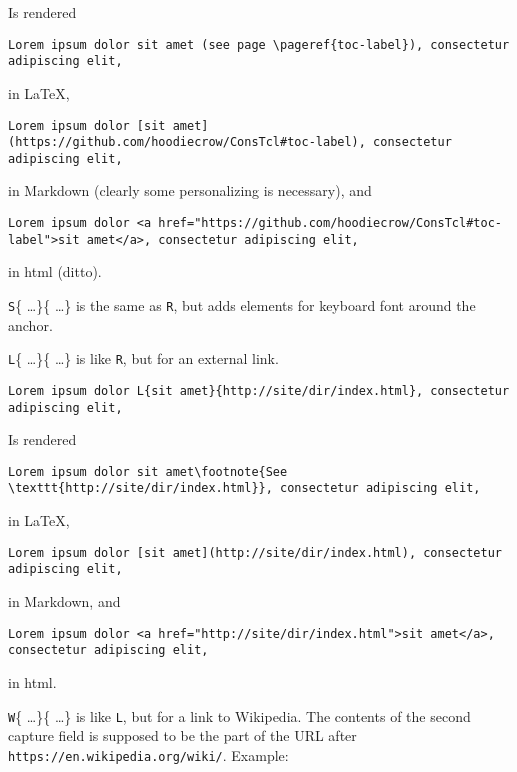 Is rendered

\begin{verbatim}
Lorem ipsum dolor sit amet (see page \pageref{toc-label}), consectetur adipiscing elit,
\end{verbatim}

in \LaTeX{},

\begin{verbatim}
Lorem ipsum dolor [sit amet](https://github.com/hoodiecrow/ConsTcl#toc-label), consectetur adipiscing elit,
\end{verbatim}

in Markdown (clearly some personalizing is necessary), and

\begin{verbatim}
Lorem ipsum dolor <a href="https://github.com/hoodiecrow/ConsTcl#toc-label">sit amet</a>, consectetur adipiscing elit,
\end{verbatim}

in html (ditto).


\texttt{S}\{ \ldots  \}\{ \ldots  \} is the same as \texttt{R}, but adds elements for keyboard font around the anchor.


\texttt{L}\{ \ldots  \}\{ \ldots  \} is like \texttt{R}, but for an external link.

\begin{verbatim}
Lorem ipsum dolor L{sit amet}{http://site/dir/index.html}, consectetur adipiscing elit,
\end{verbatim}

Is rendered

\begin{verbatim}
Lorem ipsum dolor sit amet\footnote{See \texttt{http://site/dir/index.html}}, consectetur adipiscing elit,
\end{verbatim}

in \LaTeX{},

\begin{verbatim}
Lorem ipsum dolor [sit amet](http://site/dir/index.html), consectetur adipiscing elit,
\end{verbatim}

in Markdown, and

\begin{verbatim}
Lorem ipsum dolor <a href="http://site/dir/index.html">sit amet</a>, consectetur adipiscing elit,
\end{verbatim}

in html.


\texttt{W}\{ \ldots  \}\{ \ldots  \} is like \texttt{L}, but for a link to Wikipedia. The contents of the second capture field is supposed to be the part of the URL after \texttt{https://en.wikipedia.org/wiki/}. Example:

